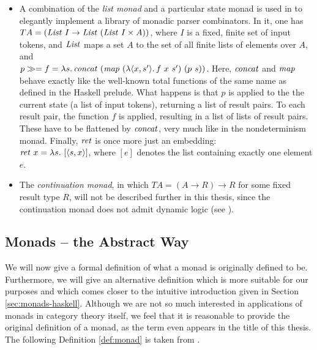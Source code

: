 \begin{itemize}
\item A combination of the \emph{list monad} and a particular state monad is
  used in \cite{HuttonMeijer96} to elegantly implement a library of monadic
  parser combinators. In it, one has\\
  $T A = (\mathit{List}\ I \to \mathit{List}\ (\mathit{List}\ I \times A))$, where $I$ is
  a fixed, finite set of input tokens, and $\mathit{List}$ maps a set $A$ to the
  set
  of all finite lists of elements over $A$, and \\
  $p \gg= f = \LambdaTerm{s}{\op{concat}\ (\op{map}\ %
    (\LambdaTerm{\langle x,s'\rangle}{f\ x\ s'})\ (p\ s))}$. Here, $\mathit{concat}$ and
  $\mathit{map}$ behave exactly like the well-known total functions of the same
  name as defined in the Haskell prelude. What happens is that $p$ is applied to
  the the current state (a list of input tokens), returning a list of result
  pairs. To each result pair, the function $f$ is applied, resulting in a list
  of lists of result pairs. These have to be flattened by $\mathit{concat}$,
  very much like in the nondeterminism monad. Finally, $\mathit{ret}$ is once more just
  an embedding:\\
  $\mathit{ret}~x = {\lambda s.\,\left[\langle s, x\rangle\right]}$, where $[e]$ denotes the
  list containing exactly one element $e$.

\item The \emph{continuation monad}, in which $T A = (A \to R) \to R$ for some fixed
  result type $R$, will not be described further in this thesis, since the
  continuation monad does not admit dynamic logic (see
  \cite{SchroederMossakowski:PDL}). 
\end{itemize}


\subsection{Monads -- the Abstract Way}
\label{sec:monads-categ-theory}

We will now give a formal definition of what a monad is originally defined to
be. Furthermore, we will give an alternative definition which is more suitable
for our purposes and which comes closer to the intuitive introduction given in
Section \ref{sec:monads-haskell}. Although we are not so much interested in
applications of monads in category theory itself, we feel that it is reasonable
to provide the original definition of a monad, as the term even appears in the
title of this thesis. The following Definition \ref{def:monad} is taken from
\cite[Chapter~VI, p.~137]{MacLane98}.


